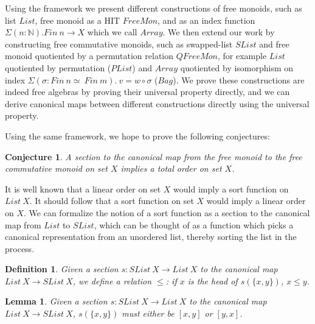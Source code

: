\documentclass{article}
\begin{document}
Using the framework we present different constructions of free monoids,
such as list $List$, free monoid as a HIT $FreeMon$, and as an index function $\Sigma (n : \mathbb{N}). Fin \: n \rightarrow X$ which we call $Array$.
We then extend our work by constructing free commutative monoids,
such as swapped-list $SList$ and free monoid quotiented by a permutation relation $QFreeMon$,
for example $List$ quotiented by permutation ($PList$)
and $Array$ quotiented by isomorphism on index $\Sigma (\sigma : Fin \: n \simeq \: Fin \: m). \: v = w \circ \sigma$ ($Bag$).
We prove these constructions are indeed free algebras by proving their universal property directly,
and we can derive canonical maps between different constructions directly using the universal property.

Using the same framework, we hope to prove the following conjectures:

\newtheorem{myconj}{Conjecture}
\newtheorem{mydef}{Definition}
\newtheorem{mylemma}{Lemma}
\newtheorem{mythm}{Proposition}

\begin{myconj}
    A section to the canonical map from the free monoid to the free commutative monoid on set $X$ implies a total order on set $X$.
\end{myconj}
It is well known that a linear order on set $X$ would imply a sort function on $List \: X$. It should follow that a sort function on set $X$
would imply a linear order on $X$. We can formalize the notion of a sort function as a section to the canonical map from $List$ to
$SList$, which can be thought of as a function which picks a canonical representation from an unordered list, thereby sorting
the list in the process.

\begin{mydef}
    Given a section $s : SList \: X \rightarrow List \: X$ to the canonical map $List \: X \rightarrow SList \: X$,
    we define a relation $\leq$: if $x$ is the head of $s(\{x, y\})$, $x \leq y$.
\end{mydef}

\begin{mylemma}
    \label{sort-either}
    Given a section $s : SList \: X \rightarrow List \: X$ to the canonical map $List \: X \rightarrow SList \: X$,
    $s(\{x, y\})$ must either be $[x, y]$ or $[y, x]$.
\end{mylemma}
\end{document}
